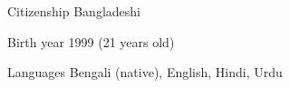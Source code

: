 
\begin{cvskills}

	\cvskill
	{Citizenship}
    {Bangladeshi}

	\cvskill
	{Birth year}
    {1999 (21 years old)}

	\cvskill
	{Languages}
    {Bengali (native), English, Hindi, Urdu}

\end{cvskills}
